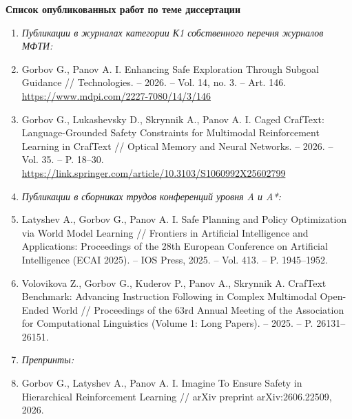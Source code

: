 \documentclass[a4paper,14pt]{extarticle}
\begin{document}
\begin{center}
{\bfseries Список опубликованных работ по теме диссертации}
\end{center}

\vspace{0.5\baselineskip}

\begin{enumerate}[leftmargin=0pt, itemindent=0pt, labelsep=0.5em, align=left, itemsep=0.25\baselineskip, parsep=0pt, listparindent=1.25cm]  \item[] \textit{Публикации в журналах категории К1 собственного перечня журналов МФТИ:}
  \item Gorbov G., Panov A. I. Enhancing Safe Exploration Through Subgoal Guidance // Technologies. -- 2026. -- Vol. 14, no. 3. -- Art. 146. \\
\url{https://www.mdpi.com/2227-7080/14/3/146}
  \item Gorbov G., Lukashevsky D., Skrynnik A., Panov A. I. Caged CrafText: Language-Grounded Safety Constraints for Multimodal Reinforcement Learning in CrafText // Optical Memory and Neural Networks. -- 2026. -- Vol. 35. -- P. 18--30. \\
\url{https://link.springer.com/article/10.3103/S1060992X25602799}
  \item[] \textit{Публикации в сборниках трудов конференций уровня A и A*:}
  \item Latyshev A., Gorbov G., Panov A. I. Safe Planning and Policy Optimization via World Model Learning // Frontiers in Artificial Intelligence and Applications: Proceedings of the 28th European Conference on Artificial Intelligence (ECAI 2025). -- IOS Press, 2025. -- Vol. 413. -- P. 1945--1952.
  \item Volovikova Z., Gorbov G., Kuderov P., Panov A., Skrynnik A. CrafText Benchmark: Advancing Instruction Following in Complex Multimodal Open-Ended World // Proceedings of the 63rd Annual Meeting of the Association for Computational Linguistics (Volume 1: Long Papers). -- 2025. -- P. 26131--26151.
  \item[] \textit{Препринты:}
  \item Gorbov G., Latyshev A., Panov A. I. Imagine To Ensure Safety in Hierarchical Reinforcement Learning // arXiv preprint arXiv:2606.22509, 2026.
\end{enumerate}
\end{document}
